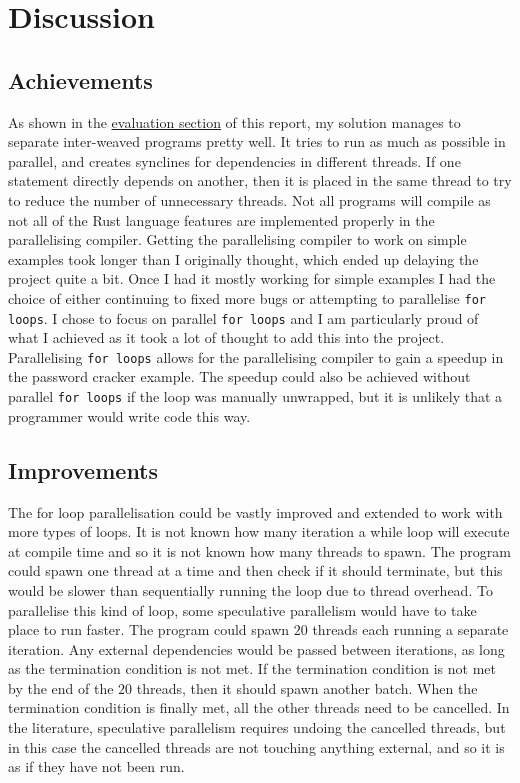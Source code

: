 \chapter{Discussion}
\label{sec:discussion}
\section{Achievements}
As shown in the \hyperref[sec:evaluation]{evaluation section} of this report, my solution manages to separate inter-weaved programs pretty well. It tries to run as much as possible in parallel, and creates synclines for dependencies in different threads. If one statement directly depends on another, then it is placed in the same thread to try to reduce the number of unnecessary threads. Not all programs will compile as not all of the Rust language features are implemented properly in the parallelising compiler. Getting the parallelising compiler to work on simple examples took longer than I originally thought, which ended up delaying the project quite a bit. Once I had it mostly working for simple examples I had the choice of either continuing to fixed more bugs or attempting to parallelise \texttt{for loops}. I chose to focus on parallel \texttt{for loops} and I am particularly proud of what I achieved as it took a lot of thought to add this into the project. Parallelising \texttt{for loops} allows for the parallelising compiler to gain a speedup in the password cracker example. The speedup could also be achieved without parallel \texttt{for loops} if the loop was manually unwrapped, but it is unlikely that a programmer would write code this way.

\section{Improvements}
The for loop parallelisation could be vastly improved and extended to work with more types of loops. It is not known how many iteration a while loop will execute at compile time and so it is not known how many threads to spawn. The program could spawn one thread at a time and then check if it should terminate, but this would be slower than sequentially running the loop due to thread overhead. To parallelise this kind of loop, some speculative parallelism would have to take place to run faster. The program could spawn $20$ threads each running a separate iteration. Any external dependencies would be passed between iterations, as long as the termination condition is not met. If the termination condition is not met by the end of the $20$ threads, then it should spawn another batch. When the termination condition is finally met, all the other threads need to be cancelled. In the literature, speculative parallelism requires undoing the cancelled threads, but in this case the cancelled threads are not touching anything external, and so it is as if they have not been run.

